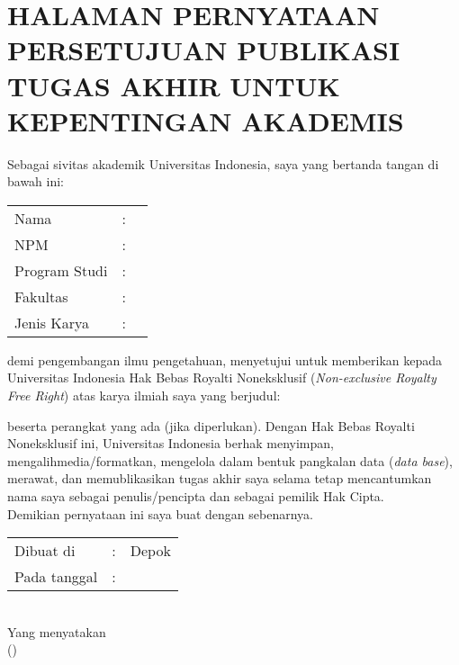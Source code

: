 %
%

\chapter*{\normalsize HALAMAN PERNYATAAN PERSETUJUAN PUBLIKASI TUGAS AKHIR UNTUK KEPENTINGAN AKADEMIS}
\begin{singlespace}
\vspace*{0.2cm}
\noindent
Sebagai sivitas akademik Universitas Indonesia, saya yang bertanda
tangan di bawah ini:
\vspace*{0.4cm}


\begin{tabular}{p{3cm} l p{8cm}}
	Nama & : & \penulis \\ 	
	NPM & : & \npm \\
	Program Studi & : & \program\\	
	Fakultas & : & \fakultas\\
	Jenis Karya & : & \type \\
\end{tabular}

\vspace*{0.6cm}
\noindent demi pengembangan ilmu pengetahuan, menyetujui untuk memberikan
kepada Universitas Indonesia Hak Bebas Royalti Noneksklusif
(\textit{Non-exclusive Royalty Free Right}) atas karya ilmiah saya yang berjudul:
\begin{center}
	\judul
\end{center}
beserta perangkat yang ada (jika diperlukan). Dengan Hak Bebas Royalti
Noneksklusif ini, Universitas Indonesia berhak menyimpan,
mengalihmedia/formatkan, mengelola dalam bentuk pangkalan data
(\textit{data base}), merawat, dan memublikasikan tugas akhir saya selama
tetap mencantumkan nama saya sebagai penulis/pencipta dan sebagai
pemilik Hak Cipta. \\

\noindent Demikian pernyataan ini saya buat dengan sebenarnya.

\begin{center}
	\vspace*{0.8cm}
	\begin{tabular}{lll}
		Dibuat di&: & Depok \\
		Pada tanggal&: & \tanggalPengesahan \\
	\end{tabular}\\

	\vspace*{0.2cm}
	Yang menyatakan \\
	\vspace*{1.1cm}
	(\penulis)
\end{center}
\end{singlespace}

\newpage

